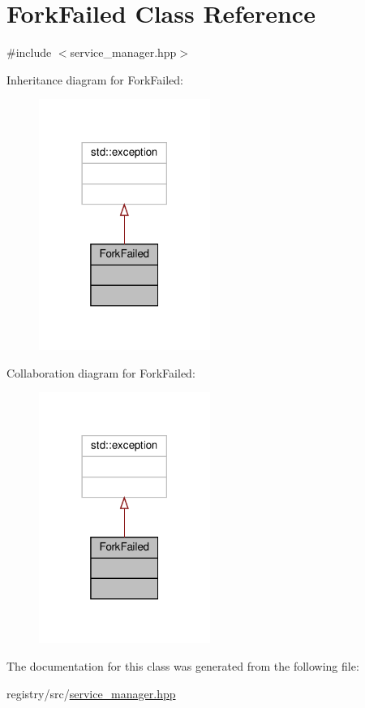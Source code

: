 \hypertarget{classForkFailed}{}\section{Fork\+Failed Class Reference}
\label{classForkFailed}


{\ttfamily \#include $<$service\+\_\+manager.\+hpp$>$}



Inheritance diagram for Fork\+Failed\+:
\nopagebreak
\begin{figure}[H]
\begin{center}
\leavevmode
\includegraphics[width=158pt]{classForkFailed__inherit__graph}
\end{center}
\end{figure}


Collaboration diagram for Fork\+Failed\+:
\nopagebreak
\begin{figure}[H]
\begin{center}
\leavevmode
\includegraphics[width=158pt]{classForkFailed__coll__graph}
\end{center}
\end{figure}


The documentation for this class was generated from the following file\+:\begin{DoxyCompactItemize}
\item 
registry/src/\hyperlink{service__manager_8hpp}{service\+\_\+manager.\+hpp}\end{DoxyCompactItemize}
